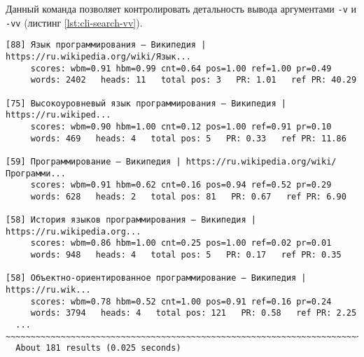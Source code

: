 Данный команда позволяет контролировать детальность вывода аргументами \verb|-v| и \verb|-vv| (листинг \ref{lst:cli-search-vv}).
\begin{lstlisting}[caption=Интерфейс командной строки: поиск., label=lst:cli-search-vv]
[88] Язык программирования — Википедия | https://ru.wikipedia.org/wiki/Язык...
     scores: wbm=0.91 hbm=0.99 cnt=0.64 pos=1.00 ref=1.00 pr=0.49
     words: 2402   heads: 11   total pos: 3   PR: 1.01   ref PR: 40.29

[75] Высокоуровневый язык программирования — Википедия | https://ru.wikiped...
     scores: wbm=0.90 hbm=1.00 cnt=0.12 pos=1.00 ref=0.91 pr=0.10
     words: 469   heads: 4   total pos: 5   PR: 0.33   ref PR: 11.86

[59] Программирование — Википедия | https://ru.wikipedia.org/wiki/Программи...
     scores: wbm=0.91 hbm=0.62 cnt=0.16 pos=0.94 ref=0.52 pr=0.29
     words: 628   heads: 2   total pos: 81   PR: 0.67   ref PR: 6.90

[58] История языков программирования — Википедия | https://ru.wikipedia.org...
     scores: wbm=0.86 hbm=1.00 cnt=0.25 pos=1.00 ref=0.02 pr=0.01
     words: 948   heads: 4   total pos: 5   PR: 0.17   ref PR: 0.35

[58] Объектно-ориентированное программирование — Википедия | https://ru.wik...
     scores: wbm=0.78 hbm=0.52 cnt=1.00 pos=0.91 ref=0.16 pr=0.24
     words: 3794   heads: 4   total pos: 121   PR: 0.58   ref PR: 2.25
  ...
~~~~~~~~~~~~~~~~~~~~~~~~~~~~~~~~~~~~~~~~~~~~~~~~~~~~~~~~~~~~~~~~~~~~~~~~~~~~~~
  About 181 results (0.025 seconds)
\end{lstlisting}
